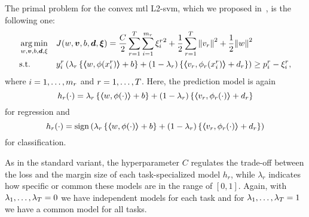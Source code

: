 The primal problem for the convex \acrshort{mtl} L2-\acrshort{svm}, which we proposed in~\cite{RuizAD21}, is the following one:
\begin{equation}\label{eq:svmmtl_primal_convex_l2}
    \begin{aligned}
    & \argmin_{w, \fv{v}, b, \fv{d}, \xi}
    & & {J({w}, \fv{v}, b, \fv{d}, \fv{\xi}) = \frac{C}{2} \sum_{r= 1}^T \sum_{i=1}^{m_r} {\xi_{i}^r}^2 + \frac{1}{2} \sum_{r= 1}^T{\norm{{v}_r}^2} + \frac{1}{2} {\norm{{w}}}^2} \\
    & \text{s.t.}
    & & y_{i}^r \left(\lambda_r \left\lbrace \dotp{w}{\phi(x_{i}^r)} + b  \right\rbrace + (1 - \lambda_r) \left\lbrace \dotp{{v}_r}{\phi_r(x_{i}^r)} + d_r \right\rbrace  \right) \geq p_{i}^r - \xi_{i}^r ,  \\
    \end{aligned}
\end{equation}
where $i=1, \ldots, m_r$ and $r=1, \ldots, T$.
Here, the prediction model is again
\begin{equation}
    \nonumber
    h_r(\cdot) = \lambda_r \left\lbrace \bm{\left\langle} w, \phi(\cdot) \bm{\right\rangle} + b  \right\rbrace + (1 - \lambda_r) \left\lbrace \bm{\left\langle} {v}_r, \phi_r(\cdot) \bm{\right\rangle} + d_r \right\rbrace
\end{equation}
for regression and 
\begin{equation}
    \nonumber
    h_r(\cdot) = \operatorname{sign}{ \left(\lambda_r \left\lbrace \bm{\left\langle} w, \phi(\cdot) \bm{\right\rangle} + b  \right\rbrace + (1 - \lambda_r) \left\lbrace \bm{\left\langle} {v}_r, \phi_r(\cdot) \bm{\right\rangle} + d_r \right\rbrace \right)}
\end{equation}
for classification.
%

As in the standard variant, the hyperparameter $C$ regulates the trade-off between the loss and the margin size of each task-specialized model $h_r$, while $\lambda_r$ indicates how specific or common these models are in the range of $[0, 1]$. Again, with $\lambda_1, \ldots, \lambda_T=0$ we have independent models for each task and for $\lambda_1, \ldots, \lambda_T=1$ we have a common model for all tasks. 
 


